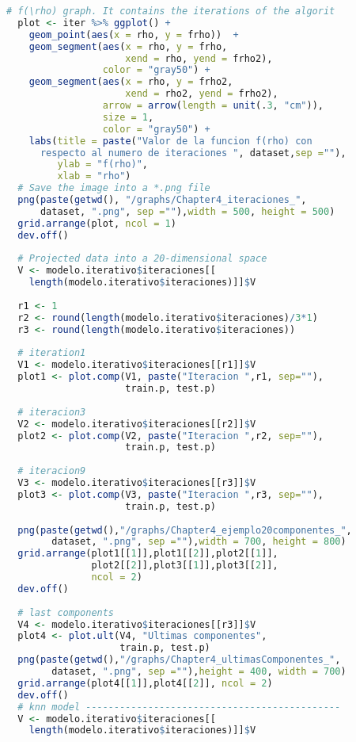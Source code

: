 \begin{lstlisting}[language=R, basicstyle=\small]
  # f(\rho) graph. It contains the iterations of the algorit
  plot <- iter %>% ggplot() +
    geom_point(aes(x = rho, y = frho))  + 
    geom_segment(aes(x = rho, y = frho, 
                     xend = rho, yend = frho2), 
                 color = "gray50") +
    geom_segment(aes(x = rho, y = frho2, 
                     xend = rho2, yend = frho2), 
                 arrow = arrow(length = unit(.3, "cm")), 
                 size = 1, 
                 color = "gray50") +
    labs(title = paste("Valor de la funcion f(rho) con 
      respecto al numero de iteraciones ", dataset,sep =""), 
         ylab = "f(rho)",
         xlab = "rho")
  # Save the image into a *.png file
  png(paste(getwd(), "/graphs/Chapter4_iteraciones_", 
      dataset, ".png", sep =""),width = 500, height = 500)
  grid.arrange(plot, ncol = 1)
  dev.off()
  
  # Projected data into a 20-dimensional space
  V <- modelo.iterativo$iteraciones[[
    length(modelo.iterativo$iteraciones)]]$V
  
  r1 <- 1
  r2 <- round(length(modelo.iterativo$iteraciones)/3*1)
  r3 <- round(length(modelo.iterativo$iteraciones))
  
  # iteration1
  V1 <- modelo.iterativo$iteraciones[[r1]]$V
  plot1 <- plot.comp(V1, paste("Iteracion ",r1, sep=""),
                     train.p, test.p)
  
  # iteracion3
  V2 <- modelo.iterativo$iteraciones[[r2]]$V
  plot2 <- plot.comp(V2, paste("Iteracion ",r2, sep=""),
                     train.p, test.p)
  
  # iteracion9
  V3 <- modelo.iterativo$iteraciones[[r3]]$V
  plot3 <- plot.comp(V3, paste("Iteracion ",r3, sep=""),
                     train.p, test.p)
  
  png(paste(getwd(),"/graphs/Chapter4_ejemplo20componentes_",
        dataset, ".png", sep =""),width = 700, height = 800)
  grid.arrange(plot1[[1]],plot1[[2]],plot2[[1]],
               plot2[[2]],plot3[[1]],plot3[[2]], 
               ncol = 2)
  dev.off()
  
  # last components
  V4 <- modelo.iterativo$iteraciones[[r3]]$V
  plot4 <- plot.ult(V4, "Ultimas componentes", 
                    train.p, test.p)
  png(paste(getwd(),"/graphs/Chapter4_ultimasComponentes_",
        dataset, ".png", sep =""),height = 400, width = 700)
  grid.arrange(plot4[[1]],plot4[[2]], ncol = 2)
  dev.off()
  # knn model ---------------------------------------------
  V <- modelo.iterativo$iteraciones[[
    length(modelo.iterativo$iteraciones)]]$V
  

\end{lstlisting}
